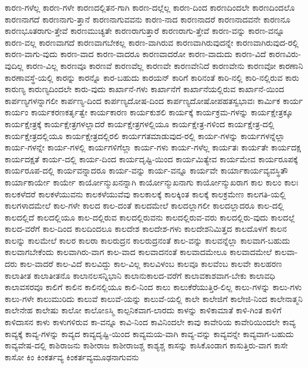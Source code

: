 {ಕಾರಣ-ಗಳೆಲ್ಲ
ಕಾರಣ-ಗಳೇ
ಕಾರಣದಲ್ಲಿತನ-ಗಾಗಿ
ಕಾರಣ-ದಲ್ಲೆಲ್ಲ
ಕಾರಣ-ದಿಂದ
ಕಾರಣದಿಂದಲೇ
ಕಾರಣದಿಂದಲೊ
ಕಾರಣನಾಗದೆ
ಕಾರಣನಾಗು-ತ್ತಾನೆ
ಕಾರಣನಾಗುವವನು
ಕಾರಣ-ನಾದ
ಕಾರಣನಾದರೆ
ಕಾರಣನಾದವನೇ
ಕಾರಣನೂ
ಕಾರಣಭೂತರಾಗು-ತ್ತೇವೆ
ಕಾರಣಮುಚ್ಯತೇ
ಕಾರಣರಾಗುತ್ತಾರೆ
ಕಾರಣರಾಗು-ತ್ತೇವೆ
ಕಾರಣ-ವನ್ನು
ಕಾರಣ-ವನ್ನೂ
ಕಾರಣ-ವಲ್ಲ
ಕಾರಣವಾಗದೆ
ಕಾರಣವಾಗಬೇಕಲ್ಲ
ಕಾರಣ-ವಾಗಿರುವ
ಕಾರಣವಾಗಿರುವುದನ್ನೇ
ಕಾರಣವಾಗಿರುವುದ-ರಲ್ಲಿ
ಕಾರಣ-ವಾಗು-ವುದು
ಕಾರಣ-ವಾದ
ಕಾರಣ-ವಾದರೂ
ಕಾರಣವಾದರೋ
ಕಾರಣ-ವಾದುದು
ಕಾರಣ-ವಿದೆ
ಕಾರಣವಿರು-ವುದಿಲ್ಲ
ಕಾರಣ-ವಿಲ್ಲ
ಕಾರಣವೂ
ಕಾರಣವೆ
ಕಾರಣವೆಲ್ಲ
ಕಾರಣವೇ
ಕಾರಣವೇನಿದೆ
ಕಾರಣವೇನು
ಕಾರಣವೋ
ಕಾರಣಾನಿ
ಕಾರಣಾವಸ್ಥೆ-ಯಲ್ಲಿ
ಕಾರನ್ನು
ಕಾರನ್ನೊ
ಕಾರ-ಬಹುದು
ಕಾರಯನ್
ಕಾರಿಗೆ
ಕಾರಿನಂತೆ
ಕಾರಿ-ನಲ್ಲಿ
ಕಾರಿ-ನಲ್ಲಿರುವ
ಕಾರು
ಕಾರುಣ್ಯ
ಕಾರುಣ್ಯದಿಂದಲೇ
ಕಾರು-ವುದು
ಕಾರ್ಖಾನೆ-ಗಳು
ಕಾರ್ಖಾನೆಗೆ
ಕಾರ್ಖಾನೆಯಲ್ಲಿರುವ
ಕಾರ್ಖಾನೆ-ಯಿಂದ
ಕಾರ್ಪಣ್ಯಗಳನ್ನಾಗಲೀ
ಕಾರ್ಪಣ್ಯ-ದಿಂದ
ಕಾರ್ಪಣ್ಯದೋಷ-ದಿಂದ
ಕಾರ್ಪಣ್ಯದೋಷೋಪಹತಸ್ವಭಾವಃ
ಕಾರ್ಮಿಕ
ಕಾರ್ಯ
ಕಾರ್ಯಂ
ಕಾರ್ಯಕರಣಕರ್ತೃತ್ವೇ
ಕಾರ್ಯಕಾರಣ
ಕಾರ್ಯಕುಶಲಿ
ಕಾರ್ಯಕ್ಕೆ
ಕಾರ್ಯಕ್ರಮ-ಗಳನ್ನು
ಕಾರ್ಯಕ್ಷೇತ್ರಕ್ಕೂ
ಕಾರ್ಯಕ್ಷೇತ್ರಕ್ಕೆ
ಕಾರ್ಯಕ್ಷೇತ್ರಗಳಲ್ಲಾದರೆ
ಕಾರ್ಯಕ್ಷೇತ್ರಗಳಲ್ಲಿಯೂ
ಕಾರ್ಯಕ್ಷೇತ್ರ-ಗಳಿಂದ
ಕಾರ್ಯಕ್ಷೇತ್ರ-ದಲ್ಲಿ
ಕಾರ್ಯಕ್ಷೇತ್ರದಲ್ಲಿಯೂ
ಕಾರ್ಯಕ್ಷೇತ್ರದಲ್ಲಿರಲಿ
ಕಾರ್ಯಗತಮಾಡುವುದ-ರಲ್ಲಿ
ಕಾರ್ಯ-ಗಳನ್ನು
ಕಾರ್ಯಗಳನ್ನೆಲ್ಲಾ
ಕಾರ್ಯ-ಗಳನ್ನೇ
ಕಾರ್ಯ-ಗಳಲ್ಲಿ
ಕಾರ್ಯಗಳಿಗೆಲ್ಲಾ
ಕಾರ್ಯ-ಗಳು
ಕಾರ್ಯ-ಗಳೆಲ್ಲ
ಕಾರ್ಯತಃ
ಕಾರ್ಯತೇ
ಕಾರ್ಯದಕ್ಷ
ಕಾರ್ಯದಕ್ಷತೆ
ಕಾರ್ಯ-ದಲ್ಲಿ
ಕಾರ್ಯ-ದಿಂದ
ಕಾರ್ಯದೃಷ್ಟಿ-ಯಿಂದ
ಕಾರ್ಯಮಿತ್ಯೇವ
ಕಾರ್ಯಮೇವ
ಕಾರ್ಯರೂಪಕ್ಕೆ
ಕಾರ್ಯರೂಪ-ದಲ್ಲಿ
ಕಾರ್ಯವನ್ನಾದರೂ
ಕಾರ್ಯ-ವನ್ನು
ಕಾರ್ಯ-ವನ್ನೂ
ಕಾರ್ಯವೇ
ಕಾರ್ಯಾಕಾರ್ಯವ್ಯವಸ್ಥಿತೌ
ಕಾರ್ಯಾಕಾರ್ಯೇ
ಕಾರ್ಯೇ
ಕಾರ್ಯೋನ್ಮುಖನನ್ನಾಗಿ
ಕಾರ್ಯೋನ್ಮುಖನಾಗು
ಕಾರ್ಯೋನ್ಮುಖರಾಗ
ಕಾಲ
ಕಾಲಂ
ಕಾಲಃ
ಕಾಲಕಳೆದರೆ
ಕಾಲಕಳೆಯುವನು
ಕಾಲಕಳೆಯುವೆವು
ಕಾಲಕಾಲಕ್ಕೆ
ಕಾಲಕ್ಕಿಂತ
ಕಾಲಕ್ಕೆ
ಕಾಲಕ್ರಮೇಣ
ಕಾಲಗತಿ-ಯಲ್ಲಿ
ಕಾಲಗಳಾದಮೇಲೆ
ಕಾಲ-ಗಳೇ
ಕಾಲದ
ಕಾಲ-ದಂತೆ
ಕಾಲದಮೇಲೆ
ಕಾಲದಲ್ಲಾಗಲೀ
ಕಾಲದಲ್ಲಾದರೂ
ಕಾಲ-ದಲ್ಲಿ
ಕಾಲದಲ್ಲಿದೆ
ಕಾಲದಲ್ಲಿಯೂ
ಕಾಲ-ದಲ್ಲಿರುವ
ಕಾಲದಲ್ಲಿರುವನು
ಕಾಲದಲ್ಲಿರುವ-ವರು
ಕಾಲದಲ್ಲಿರು-ವುದು
ಕಾಲದಲ್ಲೆ
ಕಾಲದ-ವರೆಗೆ
ಕಾಲ-ದಿಂದ
ಕಾಲದಿಂದಲೂ
ಕಾಲದೇಶ
ಕಾಲದೇಶ-ಗಳು
ಕಾಲದೇಶನಿಮಿತ್ತದ
ಕಾಲದೊಳಗೆ
ಕಾಲನ
ಕಾಲನ್ನು
ಕಾಲಮೇಲೆ
ಕಾಲರ
ಕಾಲರಾ
ಕಾಲರುದ್ರನ
ಕಾಲರುದ್ರನಂತೆ
ಕಾಲ-ವನ್ನು
ಕಾಲವನ್ನೆಲ್ಲಾ
ಕಾಲವಾಗ-ಬಹುದು
ಕಾಲವಾಗಬೇಕೆಂದು
ಕಾಲವಾಗಿರು-ವಾಗ
ಕಾಲ-ವಾದ
ಕಾಲವಾದನಂತೆ
ಕಾಲವಾದಮೇಲೂ
ಕಾಲವಾದಮೇಲೆ
ಕಾಲವಾ-ದರು
ಕಾಲ-ವಾದರೆ
ಕಾಲ-ವಿದೆ
ಕಾಲವಿದ್ದು
ಕಾಲ-ವಿಲ್ಲ
ಕಾಲವಿಳಂಬ
ಕಾಲವೂ
ಕಾಲವೆಂಬ
ಕಾಲವೇ
ಕಾಲಹರಣ
ಕಾಲಾತೀತ
ಕಾಲಾತೀತನೊ
ಕಾಲಾನಲಸನ್ನಿಭಾನಿ
ಕಾಲಾನುಕಾಲದ-ವರೆಗೆ
ಕಾಲಾವಕಾಶವಾಗ-ಬೇಕು
ಕಾಲಾವಧಿ
ಕಾಲಾವಸರವೂ
ಕಾಲಿಗೆ
ಕಾಲಿನ
ಕಾಲಿನಲ್ಲಿಯೂ
ಕಾಲಿ-ನಿಂದ
ಕಾಲು
ಕಾಲುಕೆರೆಯುತ್ತಿರ-ಲಿಲ್ಲ
ಕಾಲು-ಗಳನ್ನು
ಕಾಲು-ಗಳು
ಕಾಲು-ಗಳೇ
ಕಾಲುಮುರಿದು
ಕಾಲುವೆ
ಕಾಲುವೆ-ಯನ್ನು
ಕಾಲುವೆ-ಯಲ್ಲಿ
ಕಾಲೇ
ಕಾಲೇಜಿಗೆ
ಕಾಲೇಜಿ-ನಿಂದ
ಕಾಲೇನಾತ್ಮನಿ
ಕಾಲೇನೇಹ
ಕಾಲೇಷು
ಕಾಲೋ
ಕಾಲೋಽಸ್ಮಿ
ಕಾಲ್ಪನಿಕವಾಗ-ಲಾರದು
ಕಾಳನ್ನು
ಕಾಳಿಕಾಮಾತೆ
ಕಾಳಿ-ಗಿಂತ
ಕಾಳಿಗೆ
ಕಾಳಿದಾಸನ
ಕಾಳು
ಕಾಳುಗಳಿರುವ
ಕಾ-ವನ್ನೂ
ಕಾವಿ-ನಿಂದ
ಕಾವಿನಿಂದಲೇ
ಕಾವು
ಕಾವೇರಿಯ
ಕಾವೇರಿಯಿಂದಲೇ
ಕಾವ್ಯ
ಕಾವ್ಯಕ್ಕೆ
ಕಾವ್ಯ-ಗಳನ್ನು
ಕಾವ್ಯದ
ಕಾವ್ಯದೃಷ್ಟಿ-ಯಿಂದ
ಕಾವ್ಯಮಯ-ವಾಗಿ
ಕಾವ್ಯ-ವನ್ನು
ಕಾವ್ಯವನ್ನೇ
ಕಾವ್ಯವಾಗ-ಬಹುದು
ಕಾವ್ಯವೇಷ-ದಲ್ಲಿ
ಕಾಶಿರಾಜನು
ಕಾಶೀರಾಜ
ಕಾಶೀರಾಜಶ್ಚ
ಕಾಶ್ಯಶ್ಚ
ಕಾಸನ್ನು
ಕಾಸಿಕೊಂಡಾಗ
ಕಾಸುತ್ತಿರು-ವಾಗ
ಕಾಸೇ
ಕಾಸೋ
ಕಿಂ
ಕಿಂಕರ್ತವ್ಯ
ಕಿಂಕರ್ತವ್ಯಮೂಢನಾಗುವನು
}
